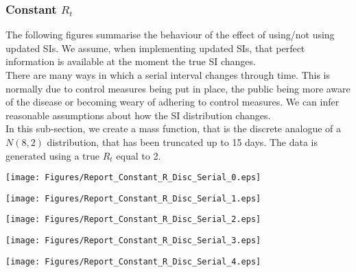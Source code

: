 \documentclass[10pt,journal,compsoc]{IEEEtran}
\begin{document}
\subsubsection{Constant $R_t$}\label{sect:Constant_R}

The following figures summarise the behaviour of the effect of using/not using updated SIs. We assume, when implementing updated SIs, that perfect information is available at the moment the true SI changes.\\
There are many ways in which a serial interval changes through time. This is normally due to control measures being put in place, the public being more aware of the disease or becoming weary of adhering to control measures. We can infer reasonable assumptions about how the SI distribution changes.\\
In this sub-section, we create a mass function, that is the discrete analogue of a $N(8, 2)$ distribution, that has been truncated up to 15 days. The data is generated using a true $R_t$ equal to 2.
\begin{minipage}{\linewidth}
\centering
\texttt{[image: Figures/Report\_Constant\_R\_Disc\_Serial\_0.eps]}
\label{fig:Constant_R_Disc_Serial_0}
\end{minipage}  
  
\begin{minipage}{\linewidth}
\centering
\texttt{[image: Figures/Report\_Constant\_R\_Disc\_Serial\_1.eps]}
\label{fig:Constant_R_Disc_Serial_1}
\end{minipage}

\begin{minipage}{\linewidth}
\centering
\texttt{[image: Figures/Report\_Constant\_R\_Disc\_Serial\_2.eps]}
\label{fig:Constant_R_Disc_Serial_2}
\end{minipage}

\begin{minipage}{\linewidth}
\centering
\texttt{[image: Figures/Report\_Constant\_R\_Disc\_Serial\_3.eps]}
\label{fig:Constant_R_Disc_Serial_3}
\end{minipage}

\begin{minipage}{\linewidth}
\centering
\texttt{[image: Figures/Report\_Constant\_R\_Disc\_Serial\_4.eps]}
\label{fig:Constant_R_Disc_Serial_4}
\end{minipage}
\end{document}
